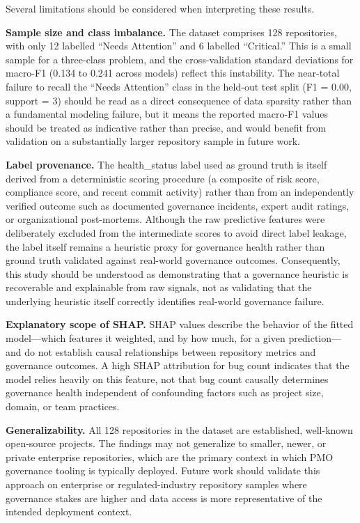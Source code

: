 \documentclass[conference]{IEEEtran}
\begin{document}
Several limitations should be considered when interpreting these results.

\textbf{Sample size and class imbalance.} The dataset comprises 128 repositories, with
only 12 labelled ``Needs Attention'' and 6 labelled ``Critical.'' This is a small sample
for a three-class problem, and the cross-validation standard deviations for macro-F1
(0.134 to 0.241 across models) reflect this instability. The near-total failure to
recall the ``Needs Attention'' class in the held-out test split (F1 = 0.00, support = 3)
should be read as a direct consequence of data sparsity rather than a fundamental
modeling failure, but it means the reported macro-F1 values should be treated as
indicative rather than precise, and would benefit from validation on a substantially
larger repository sample in future work.

\textbf{Label provenance.} The health\_status label used as ground truth is itself
derived from a deterministic scoring procedure (a composite of risk score, compliance
score, and recent commit activity) rather than from an independently verified outcome
such as documented governance incidents, expert audit ratings, or organizational
post-mortems. Although the raw predictive features were deliberately excluded from the
intermediate scores to avoid direct label leakage, the label itself remains a heuristic
proxy for governance health rather than ground truth validated against real-world
governance outcomes. Consequently, this study should be understood as demonstrating that
a governance heuristic is recoverable and explainable from raw signals, not as validating
that the underlying heuristic itself correctly identifies real-world governance failure.

\textbf{Explanatory scope of SHAP.} SHAP values describe the behavior of the fitted
model---which features it weighted, and by how much, for a given prediction---and do not
establish causal relationships between repository metrics and governance outcomes. A
high SHAP attribution for bug count indicates that the model relies heavily on this
feature, not that bug count causally determines governance health independent of
confounding factors such as project size, domain, or team practices.

\textbf{Generalizability.} All 128 repositories in the dataset are established,
well-known open-source projects. The findings may not generalize to smaller, newer, or
private enterprise repositories, which are the primary context in which PMO governance
tooling is typically deployed. Future work should validate this approach on enterprise
or regulated-industry repository samples where governance stakes are higher and data
access is more representative of the intended deployment context.
\end{document}
